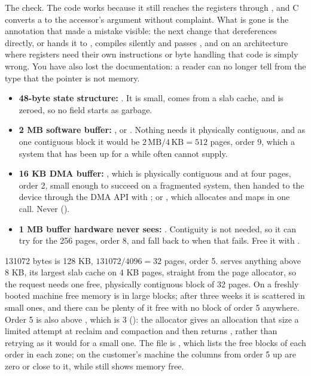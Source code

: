  The check. The code works because it still reaches the registers through ,
and C converts a  to the accessor's  argument
without complaint. What is gone is the annotation that made a mistake visible: the next change
that dereferences  directly, or hands it to , compiles silently and passes
, and on an architecture where registers need their own instructions or byte handling
that code is simply wrong. You have also lost the documentation: a reader can no longer tell from
the type that the pointer is not memory.


\begin{itemize}
  \item \textbf{48-byte state structure:} . It is small,
    comes from a slab cache, and is zeroed, so no field starts as garbage.
  \item \textbf{2 MB software buffer:} , or . Nothing needs it
    physically contiguous, and as one contiguous block it would be $2\,\mathrm{MB} / 4\,\mathrm{KB}
    = 512$ pages, order 9, which a system that has been up for a while often cannot supply.
  \item \textbf{16 KB DMA buffer:} , which is physically contiguous
    and at four pages, order 2, small enough to succeed on a fragmented system, then handed to the
    device through the DMA API with ; or , which
    allocates and maps in one call. Never  ().
  \item \textbf{1 MB buffer hardware never sees:} . Contiguity is not needed, so it
    can try  for the 256 pages, order 8, and fall back to  when that
    fails. Free it with .
\end{itemize}

 131072 bytes is 128 KB, $131072 / 4096 = 32$ pages, order 5.  serves
anything above 8 KB, its largest slab cache on 4 KB pages, straight from the page allocator, so the
request needs one free, physically contiguous block of 32 pages. On a freshly booted machine free
memory is in large blocks; after three weeks it is scattered in small ones, and there can be plenty
of it free with no block of order 5 anywhere. Order 5 is also above ,
which is 3 (): the allocator gives an allocation that size a limited
attempt at reclaim and compaction and then returns , rather than retrying as it would for
a small one. The file is , which lists the free blocks of each order in each
zone; on the customer's machine the columns from order 5 up are zero or close to it, while
 still shows memory free.

